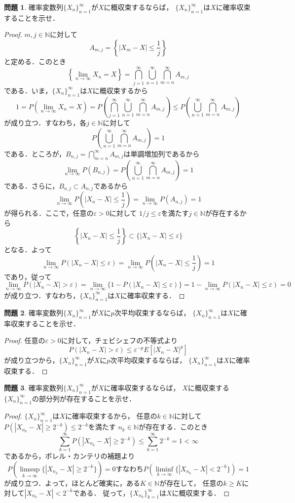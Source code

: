 \documentclass{jsarticle}
\theoremstyle{definition}
\newtheorem{qst}{問題}
\begin{document}
\begin{qst}
確率変数列$\{X_n\}_{n=1}^\infty$が$X$に概収束するならば，
$\{X_n\}_{n=1}^\infty$は$X$に確率収束することを示せ．
\end{qst}
\begin{proof}
$m,j\in\mathbb{N}$に対して
\[ A_{m,j}=\left\{|X_m-X|\leq\frac{1}{j}\right\} \]
と定める．このとき
\[
\left\{\lim_{n\to\infty}X_n=X\right\}
=\bigcap_{j=1}^\infty\bigcup_{n=1}^\infty\bigcap_{m=n}^\infty A_{m,j}
\]
である．いま，$\{X_n\}_{n=1}^\infty$は$X$に概収束するから
\[
1=P\left(\lim_{n\to\infty}X_n=X\right)
=P\left(\bigcap_{j=1}^\infty\bigcup_{n=1}^\infty\bigcap_{m=n}^\infty A_{m,j}\right)
\leq P\left(\bigcup_{n=1}^\infty\bigcap_{m=n}^\infty A_{m,j}\right)
\]
が成り立つ．すなわち，各$j\in\mathbb{N}$に対して
\[ P\left(\bigcup_{n=1}^\infty\bigcap_{m=n}^\infty A_{m,j}\right)=1 \]
である．ところが，$B_{n,j}=\bigcap_{m=n}^\infty A_{m,j}$は単調増加列であるから
\[
\lim_{n\to\infty}P(B_{n,j})
=P\left(\bigcup_{n=1}^\infty\bigcap_{m=n}^\infty A_{m,j}\right)=1
\]
である．さらに，$B_{n,j}\subset A_{n,j}$であるから
\[ \lim_{n\to\infty}P\left(|X_n-X|\leq\frac{1}{j}\right)=\lim_{n\to\infty}P(A_{n,j})=1 \]
が得られる．ここで，任意の$\varepsilon>0$に対して
$1/j\leq\varepsilon$を満たす$j\in\mathbb{N}$が存在するから
\[ \left\{|X_n-X|\leq\frac{1}{j}\right\}\subset\{|X_n-X|\leq\varepsilon\} \]
となる．よって
\[
\lim_{n\to\infty}P(|X_n-X|\leq\varepsilon)
=\lim_{n\to\infty}P\left(|X_n-X|\leq\frac{1}{j}\right)=1
\]
であり，従って
\[
\lim_{n\to\infty}P(|X_n-X|>\varepsilon)
=\lim_{n\to\infty}\{1-P(|X_n-X|\leq\varepsilon)\}
=1-\lim_{n\to\infty}P(|X_n-X|\leq\varepsilon)
=0
\]
が成り立つ．すなわち，$\{X_n\}_{n=1}^\infty$は$X$に確率収束する．
\end{proof}

\begin{qst}
確率変数列$\{X_n\}_{n=1}^\infty$が$X$に$p$次平均収束するならば，
$\{X_n\}_{n=1}^\infty$は$X$に確率収束することを示せ．
\end{qst}
\begin{proof}
任意の$\varepsilon>0$に対して，チェビシェフの不等式より
\[ P(|X_n-X|>\varepsilon)\leq\varepsilon^{-p}E[|X_n-X|^p] \]
が成り立つから，$\{X_n\}_{n=1}^\infty$が$X$に$p$次平均収束するならば，
$\{X_n\}_{n=1}^\infty$は$X$に確率収束する．
\end{proof}

\begin{qst}
確率変数列$\{X_n\}_{n=1}^\infty$が$X$に確率収束するならば，
$X$に概収束する$\{X_n\}_{n=1}^\infty$の部分列が存在することを示せ．
\end{qst}
\begin{proof}
$\{X_n\}_{n=1}^\infty$は$X$に確率収束するから，
任意の$k\in\mathbb{N}$に対して$P(|X_{n_k}-X|\geq2^{-k})\leq2^{-k}$を満たす
$n_k\in\mathbb{N}$が存在する．このとき
\[ \sum_{k=1}^\infty P(|X_{n_k}-X|\geq2^{-k})\leq\sum_{k=1}^\infty2^{-k}=1<\infty \]
であるから，ボレル・カンテリの補題より
\[
P\left(\limsup_{k\to\infty}\{|X_{n_k}-X|\geq2^{-k}\}\right)=0
\text{すなわち}
P\left(\liminf_{k\to\infty}\{|X_{n_k}-X|<2^{-k}\}\right)=1
\]
が成り立つ．よって，ほとんど確実に，ある$K\in\mathbb{N}$が存在して，
任意の$k\geq K$に対して$|X_{n_k}-X|<2^{-k}$である．
従って，$\{X_{n_k}\}_{k=1}^\infty$は$X$に概収束する．
\end{proof}
\end{document}

